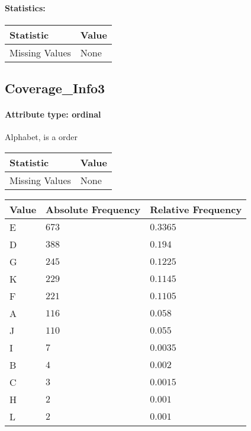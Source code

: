 \paragraph{Statistics: }
\begin{table}[H]
	\renewcommand{\arraystretch}{1.25}
	\begin{tabular}{l|l}
		\textbf{Statistic} & \textbf{Value}\\\hline
		Missing Values& None\\\hline
	\end{tabular}
\end{table}

\subsection{Coverage\_Info3}
\paragraph{Attribute type: ordinal}
Alphabet, is a order
\qquad

\begin{table}[H]
	\renewcommand{\arraystretch}{1.25}
	\begin{tabular}{l|l}
		\textbf{Statistic} & \textbf{Value}\\\hline
		Missing Values& None\\\hline
	\end{tabular}
\end{table}
\begin{table}[H]
	\renewcommand{\arraystretch}{1.25}
	\begin{tabular}{l|l|l}
		\textbf{Value} & \textbf{Absolute Frequency} & \textbf{Relative Frequency}\\\hline
E&$673$&$0.3365$\\\hline
D&$388$&$0.194$\\\hline
G&$245$&$0.1225$\\\hline
K&$229$&$0.1145$\\\hline
F&$221$&$0.1105$\\\hline
A&$116$&$0.058$\\\hline
J&$110$&$0.055$\\\hline
I&$7$&$0.0035$\\\hline
B&$4$&$0.002$\\\hline
C&$3$&$0.0015$\\\hline
H&$2$&$0.001$\\\hline
L&$2$&$0.001$
	\end{tabular}
\end{table}


